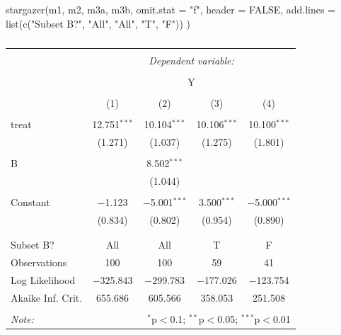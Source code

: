 \documentclass[
]{article}
\newenvironment{Shaded}{\begin{snugshade}}{\end{snugshade}}
\newcommand{\AttributeTok}[1]{\textcolor[rgb]{0.77,0.63,0.00}{#1}}
\newcommand{\ConstantTok}[1]{\textcolor[rgb]{0.00,0.00,0.00}{#1}}
\newcommand{\FunctionTok}[1]{\textcolor[rgb]{0.00,0.00,0.00}{#1}}
\newcommand{\NormalTok}[1]{#1}
\newcommand{\StringTok}[1]{\textcolor[rgb]{0.31,0.60,0.02}{#1}}
\begin{document}
\begin{Shaded}
\begin{Highlighting}[]
\FunctionTok{stargazer}\NormalTok{(m1, m2, m3a, m3b, }\AttributeTok{omit.stat =} \StringTok{"f"}\NormalTok{, }\AttributeTok{header =} \ConstantTok{FALSE}\NormalTok{,}
          \AttributeTok{add.lines =} \FunctionTok{list}\NormalTok{(}\FunctionTok{c}\NormalTok{(}\StringTok{"Subset B?"}\NormalTok{, }\StringTok{"All"}\NormalTok{, }\StringTok{"All"}\NormalTok{, }\StringTok{"T"}\NormalTok{, }\StringTok{"F"}\NormalTok{))}
\NormalTok{          )}
\end{Highlighting}
\end{Shaded}

\begin{table}[!htbp] \centering 
  \caption{} 
  \label{} 
\begin{tabular}{@{\extracolsep{5pt}}lcccc} 
\\[-1.8ex]\hline 
\hline \\[-1.8ex] 
 & \multicolumn{4}{c}{\textit{Dependent variable:}} \\ 
\cline{2-5} 
\\[-1.8ex] & \multicolumn{4}{c}{Y} \\ 
\\[-1.8ex] & (1) & (2) & (3) & (4)\\ 
\hline \\[-1.8ex] 
 treat & 12.751$^{***}$ & 10.104$^{***}$ & 10.106$^{***}$ & 10.100$^{***}$ \\ 
  & (1.271) & (1.037) & (1.275) & (1.801) \\ 
  & & & & \\ 
 B &  & 8.502$^{***}$ &  &  \\ 
  &  & (1.044) &  &  \\ 
  & & & & \\ 
 Constant & $-$1.123 & $-$5.001$^{***}$ & 3.500$^{***}$ & $-$5.000$^{***}$ \\ 
  & (0.834) & (0.802) & (0.954) & (0.890) \\ 
  & & & & \\ 
\hline \\[-1.8ex] 
Subset B? & All & All & T & F \\ 
Observations & 100 & 100 & 59 & 41 \\ 
Log Likelihood & $-$325.843 & $-$299.783 & $-$177.026 & $-$123.754 \\ 
Akaike Inf. Crit. & 655.686 & 605.566 & 358.053 & 251.508 \\ 
\hline 
\hline \\[-1.8ex] 
\textit{Note:}  & \multicolumn{4}{r}{$^{*}$p$<$0.1; $^{**}$p$<$0.05; $^{***}$p$<$0.01} \\ 
\end{tabular} 
\end{table}
\end{document}
